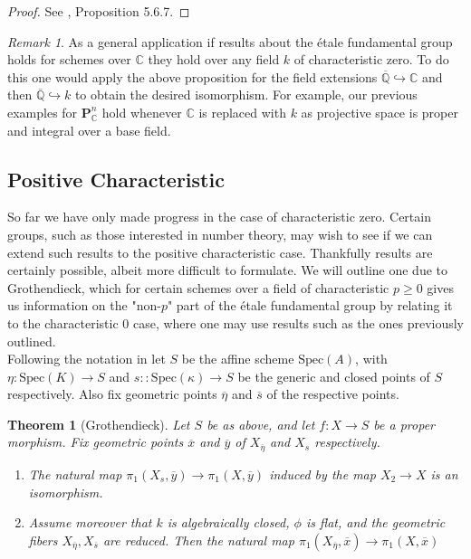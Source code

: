 \documentclass{article}
\newtheorem{theorem}{Theorem}[section]
\theoremstyle{definition}
\theoremstyle{remark}
\newtheorem*{remark}{Remark}
\theoremstyle{plain}
\newcommand{\C}{\mathbb{C}}
\newcommand{\Q}{\mathbb{Q}}
\begin{document}
\begin{proof}
	See \cite{Szamuely}, Proposition 5.6.7.
\end{proof}

\begin{remark}
	As a general application if results about the \'etale fundamental group holds for schemes over $\C$ they hold over any field  $k$ of characteristic zero.
	To do this one would apply the above proposition for the field extensions $\overline{\Q} \hookrightarrow \C$ and then $\overline{\Q} \hookrightarrow k$ to obtain the desired isomorphism.
	For example, our previous examples for $\textbf{P}_{\C}^n$ hold whenever $\C$ is replaced with $k$ as projective space is proper and integral over a base field.
\end{remark}

\subsection{Positive Characteristic}

So far we have only made progress in the case of characteristic zero.
Certain groups, such as those interested in number theory, may wish to see if we can extend such results
to the positive characteristic case.
Thankfully results are certainly possible, albeit more difficult to formulate.
We will outline one due to Grothendieck, which for certain schemes over a field of characteristic $p \geq 0$ gives us information on the "non-$p$" part of the \'etale fundamental group by relating it to the characteristic 0 case, where one may use results such as the ones previously outlined.\\

\indent Following the notation in \cite{Szamuely} let $S$ be the affine scheme $\text{Spec}(A)$, with $\eta \colon \text{Spec}(K) \to S$ and $s \colon: \text{Spec}(\kappa) \to S$ be the generic and closed points of $S$ respectively.
Also fix geometric points $\overline{\eta}$ and $\overline{s}$ of the respective points.

\begin{theorem}[Grothendieck]
	Let $S$ be as above, and let $f: X \to S$ be a proper morphism.
	Fix geometric points $\overline{x}$ and $\overline{y}$ of $X_{\overline{\eta}}$ and $X_s$ respectively.
	\begin{enumerate}
		\item The natural map $\pi_1(X_s, \overline{y}) \to \pi_1(X, \overline{y})$ induced by the map $X_2 \to X$ is an isomorphism.
		\item Assume moreover that $k$ is algebraically closed, $\phi$ is flat, and the geometric fibers $X_{\overline{\eta}}, X_{\overline{s}}$  are reduced.
			Then the natural map $\pi_1(X_{\overline{\eta}}, \overline{x}) \to \pi_1(X, \overline{x})$
	\end{enumerate}
	
\end{theorem}
\end{document}

